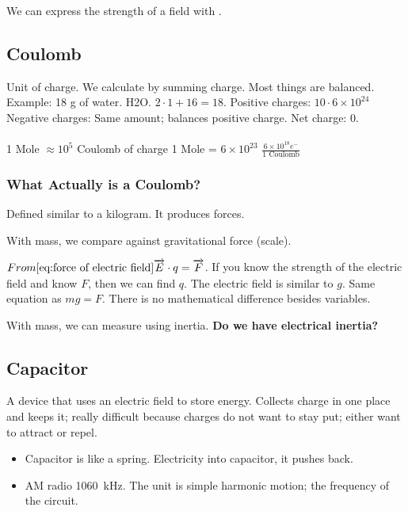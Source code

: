 \documentclass[article, 12pt]{article}
\theoremstyle{definition}
\begin{document}
    We can express the strength of a field with \SI{}{\frac{\newton}{\coulomb}}.

    \subsection{Coulomb}
    Unit of charge. We calculate by summing charge. Most things are balanced. Example: 18 g of water. H2O. $2 \cdot 1 + 16 = 18$.
    Positive charges: $10 \cdot 6 \times 10^{24}$
    Negative charges: Same amount; balances positive charge.
    Net charge: 0.
    \\
    \\
    1 Mole $\approx 10^5$ Coulomb of charge
    1 Mole = $6 \times 10^{23}$ 
    $\frac{6\times10^{18} e^{-}}{1 \text{ Coulomb}}$
    \subsubsection{What Actually is a Coulomb?}
    Defined similar to a kilogram. It produces forces.
    
    With mass, we compare against gravitational force (scale). 

    $From \autoref{eq:force of electric field} \overrightarrow{E} \cdot q = \overrightarrow{F}$. If you know the strength of the electric field and know $F$, then we can find $q$. The electric field is similar to $g$. Same equation as $mg = F$. There is no mathematical difference besides variables. 

    With mass, we can measure using inertia. \textbf{Do we have electrical inertia?}
    \subsection{Capacitor}
    A device that uses an electric field to store energy. Collects charge in one place and keeps it; really difficult because charges do not want to stay put; either want to attract or repel.
    \begin{itemize}
        \item Capacitor is like a spring. Electricity into capacitor, it pushes back. 
        \item AM radio \SI{1060}{\kilo\hertz}. The unit is simple harmonic motion; the frequency of the circuit.
    \end{itemize}
\end{document}
